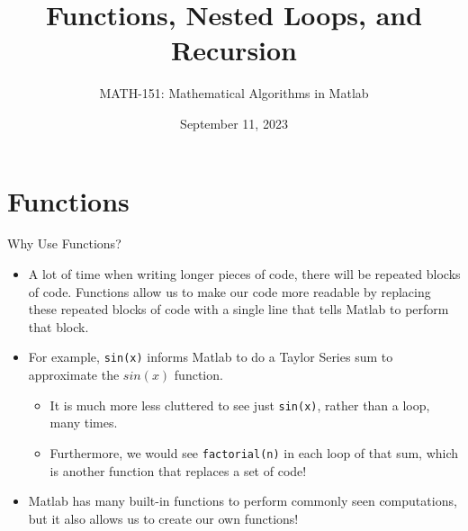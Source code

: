 {}\documentclass[letterpaper,
compress,
xcolor=x11names,
]{beamer}
\begin{document}
	\title{Functions, Nested Loops, and Recursion}
	\author{MATH-151:  Mathematical Algorithms in Matlab}
	\date[202X]{September 11, 2023}




\begin{frame}
\titlepage
\end{frame}
\section{Functions}

\begin{frame}{Why Use Functions?}
	\footnotesize
	\begin{itemize}
		\item A lot of time when writing longer pieces of code, there will be repeated blocks of code. Functions allow us to make our code more readable by replacing these repeated blocks of code with a single line that tells Matlab to perform that block.
		\item<2-> For example, \texttt{sin(x)} informs Matlab to do a Taylor Series sum to approximate the $sin(x)$ function.
		\begin{itemize}
			\item It is much more less cluttered to see just \texttt{sin(x)}, rather than a loop, many times.
			\item Furthermore, we would see \texttt{factorial(n)} in each loop of that sum, which is another function that replaces a set of code! 
		\end{itemize}
		\item<3-> Matlab has many built-in functions to perform commonly seen computations, but it also allows us to create our own functions! 
	\end{itemize}
\end{frame}

\end{document}
